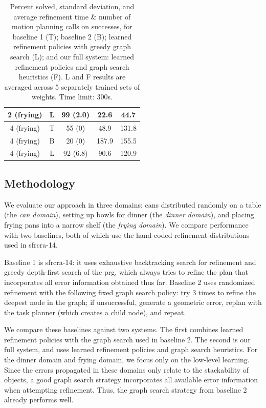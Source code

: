\begin{table}[t]
{\begin{tabular}{ccccc}
      2 (frying) & L & 99 (2.0) & 22.6 & 44.7\\
    \midrule[1.5pt]
      4 (frying) & T & 55 (0) & 48.9 & 131.8\\
    \midrule
      4 (frying) & B & 20 (0) & 187.9 & 155.5\\
    \midrule
      4 (frying) & L & 92 (6.8) & 90.6 & 120.9\\
    \bottomrule[1.5pt]
  \end{tabular}}
  \caption{\small{Percent solved, standard deviation, and average refinement time \& number of motion
      planning calls on successes, for baseline 1 (T); baseline 2
      (B); learned refinement policies with greedy graph search (L);
      and our full system: learned refinement policies and graph
      search heuristics (F). L and F results are averaged across 5
      separately trained sets of weights. Time limit: 300s.}}
  \label{table:results}
\end{table}

\subsection{Methodology}
We evaluate our approach in three domains: cans distributed randomly
on a table (the \emph{can domain}), setting up bowls for dinner (the
\emph{dinner domain}), and placing frying pans into a narrow shelf
(the \emph{frying domain}).  We compare performance with two
baselines, both of which use the hand-coded refinement distributions
used in {\sc sfrcra-14}.

Baseline 1 is {\sc sfrcra-14}: it uses exhaustive backtracking search
for refinement and greedy depth-first search of the {\sc prg}, which
always tries to refine the plan that incorporates all error
information obtained thus far.  Baseline 2 uses randomized refinement
with the following fixed graph search policy: try 3 times to refine
the deepest node in the graph; if unsuccessful, generate a geometric
error, replan with the task planner (which creates a child node), and
repeat.

We compare these baselines against two systems. The first combines
learned refinement policies with the graph search used in baseline
2. The second is our full system, and uses learned refinement policies
and graph search heuristics.  For the dinner domain and frying domain,
we focus only on the low-level learning. Since the errors propagated in these
domains only relate to the stackability of objects, a good graph search strategy
incorporates all available error information when
attempting refinement. Thus, the graph search strategy from baseline 2
already performs well.

